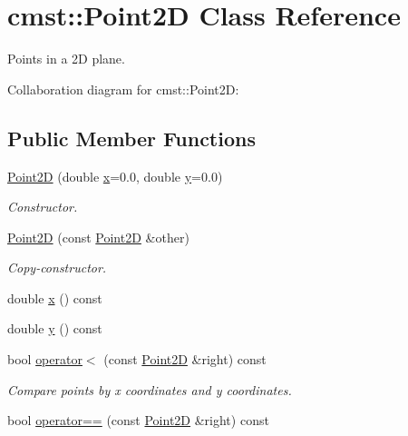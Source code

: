 \hypertarget{classcmst_1_1_point2_d}{}\section{cmst::Point2D Class Reference}
\label{classcmst_1_1_point2_d}


Points in a 2D plane.  




Collaboration diagram for cmst::Point2D:
\subsection*{Public Member Functions}
\begin{DoxyCompactItemize}
\item 
\hyperlink{classcmst_1_1_point2_d_a2291fb012502a29399852810b5a081a8}{Point2D} (double \hyperlink{classcmst_1_1_point2_d_a7745045ba529c4f2a2a0384974a42448}{x}=0.0, double \hyperlink{classcmst_1_1_point2_d_a15a4383f1c181b7c7518ccac6f578564}{y}=0.0)
\begin{DoxyCompactList}\small\item\em Constructor. \end{DoxyCompactList}\item 
\hyperlink{classcmst_1_1_point2_d_a24e903416a709a44f844b93c7295ed67}{Point2D} (const \hyperlink{classcmst_1_1_point2_d}{Point2D} \&other)
\begin{DoxyCompactList}\small\item\em Copy-\/constructor. \end{DoxyCompactList}\item 
double \hyperlink{classcmst_1_1_point2_d_a7745045ba529c4f2a2a0384974a42448}{x} () const 
\item 
double \hyperlink{classcmst_1_1_point2_d_a15a4383f1c181b7c7518ccac6f578564}{y} () const 
\item 
bool \hyperlink{classcmst_1_1_point2_d_ada9efa4e0f4d7906e2ccaf2afeefea38}{operator$<$} (const \hyperlink{classcmst_1_1_point2_d}{Point2D} \&right) const 
\begin{DoxyCompactList}\small\item\em Compare points by x coordinates and y coordinates. \end{DoxyCompactList}\item 
bool \hyperlink{classcmst_1_1_point2_d_a2181e34aa07d5ce5ac48545408924d22}{operator==} (const \hyperlink{classcmst_1_1_point2_d}{Point2D} \&right) const 
\end{DoxyCompactItemize}
